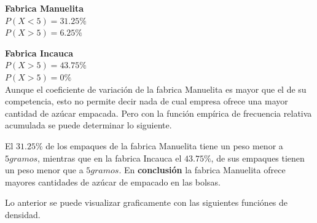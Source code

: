 \documentclass[12pt]{article}
\begin{document}
	\textbf{{\large Fabrica Manuelita}}\\
	$P(X<5) = 31.25\%$ \\
	$P(X>5) = 6.25\%$ \\
	\vspace{0.2cm}
	
	\textbf{{\large Fabrica Incauca}}\\
	$P(X>5) = 43.75\%$ \\
	$P(X>5) = 0\%$ \\
	
	Aunque el coeficiente de variación de la fabrica Manuelita es mayor que el de su competencia, esto no permite decir nada de cual empresa ofrece una mayor cantidad de azúcar empacada. Pero con la función empírica de frecuencia relativa acumulada se puede determinar lo siguiente.
	
	El $31.25\%$ de los empaques de la fabrica Manuelita tiene un peso menor a $5 gramos$, mientras que en la fabrica Incauca el  $43.75\%$, de sus empaques tienen un peso menor que a $5 gramos$.
	En \textbf{conclusión} la fabrica Manuelita ofrece mayores cantidades de azúcar de empacado en las bolsas. 
	
	Lo anterior se puede visualizar graficamente con las siguientes funciónes de densidad. \\
	
\end{document}
